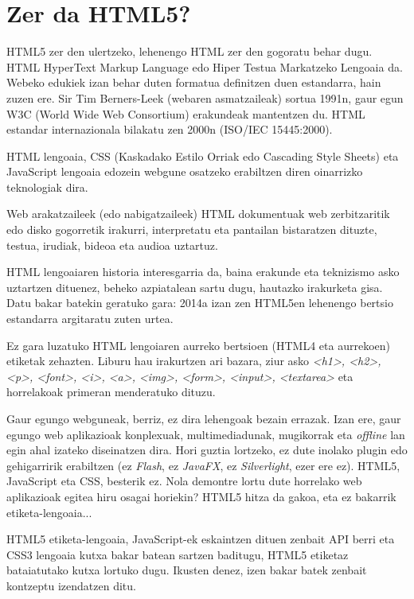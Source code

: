 \chapter{Zer da HTML5?}

HTML5 zer den ulertzeko, lehenengo HTML zer den gogoratu behar dugu. HTML HyperText Markup Language edo Hiper Testua Markatzeko Lengoaia da. Webeko edukiek izan behar duten formatua definitzen duen estandarra, hain zuzen ere. Sir Tim Berners-Leek (webaren asmatzaileak) sortua 1991n, gaur egun
W3C (World Wide Web Consortium) erakundeak mantentzen du. HTML estandar internazionala bilakatu zen 2000n (ISO/IEC 15445:2000).

HTML lengoaia, CSS (Kaskadako Estilo Orriak edo Cascading Style Sheets) eta JavaScript lengoaia edozein webgune osatzeko erabiltzen diren oinarrizko teknologiak dira.

Web arakatzaileek (edo nabigatzaileek) HTML dokumentuak web zerbitzaritik edo disko gogorretik irakurri, interpretatu eta pantailan bistaratzen dituzte, testua, irudiak, bideoa eta audioa uztartuz.

HTML lengoaiaren historia interesgarria da, baina erakunde eta teknizismo asko uztartzen dituenez, beheko azpiatalean sartu dugu, hautazko irakurketa gisa. Datu bakar batekin geratuko gara: 2014a izan zen HTML5en lehenengo bertsio estandarra argitaratu zuten urtea.

Ez gara luzatuko HTML lengoiaren aurreko bertsioen (HTML4 eta aurrekoen) etiketak zehazten. Liburu hau irakurtzen ari bazara, ziur asko \textit{<h1>, <h2>, <p>, <font>, <i>, <a>, <img>, <form>, <input>, <textarea>} eta horrelakoak primeran menderatuko dituzu. 

Gaur egungo webguneak, berriz, ez dira lehengoak bezain errazak. Izan ere, gaur egungo web aplikazioak konplexuak, multimediadunak, mugikorrak eta \mbox{\textit{offline}} lan egin ahal izateko diseinatzen dira. Hori guztia lortzeko, ez dute inolako plugin edo gehigarririk erabiltzen (ez \textit{Flash}, ez \textit{JavaFX}, ez \textit{Silverlight}, ezer ere ez). HTML5, JavaScript eta CSS, besterik ez. Nola demontre lortu dute horrelako web aplikazioak egitea hiru osagai horiekin? HTML5 hitza da gakoa, eta ez bakarrik etiketa-lengoaia...

HTML5 etiketa-lengoaia, JavaScript-ek eskaintzen dituen zenbait API berri eta CSS3 lengoaia kutxa bakar batean sartzen baditugu, HTML5 etiketaz bataiatutako kutxa lortuko dugu. Ikusten denez, izen bakar batek zenbait kontzeptu izendatzen ditu.


